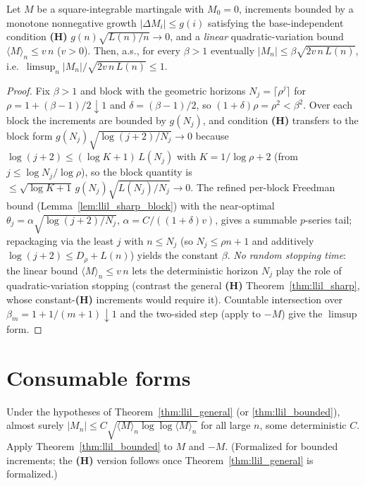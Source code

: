 \begin{theorem}
\label{thm:llil_growth_sharp}
\leanok
{}
Let $M$ be a square-integrable martingale with $M_0=0$, increments bounded by a monotone
nonnegative growth $|\Delta M_i|\le g(i)$ satisfying the base-independent condition
\textbf{(H)} $g(n)\sqrt{L(n)/n}\to0$, and a \emph{linear} quadratic-variation bound
$\langle M\rangle_n\le v\,n$ ($v>0$). Then, a.s., for every $\beta>1$ eventually
$|M_n|\le\beta\sqrt{2v\,n\,L(n)}$, i.e.\ $\limsup_n|M_n|/\sqrt{2v\,n\,L(n)}\le1$.
\end{theorem}
\begin{proof}\leanok
Fix $\beta>1$ and block with the geometric horizons $N_j=\lceil\rho^j\rceil$ for
$\rho=1+(\beta-1)/2\downarrow1$ and $\delta=(\beta-1)/2$, so $(1+\delta)\rho=\rho^2<\beta^2$.
Over each block the increments are bounded by $g(N_j)$, and condition \textbf{(H)} transfers
to the block form $g(N_j)\sqrt{\log(j+2)/N_j}\to0$ because
$\log(j+2)\le(\log K+1)\,L(N_j)$ with $K=1/\log\rho+2$ (from $j\le\log N_j/\log\rho$), so the
block quantity is $\le\sqrt{\log K+1}\,g(N_j)\sqrt{L(N_j)/N_j}\to0$. The refined per-block
Freedman bound (Lemma~\ref{lem:llil_sharp_block}) with the near-optimal
$\theta_j=\alpha\sqrt{\log(j+2)/N_j}$, $\alpha=C/((1+\delta)v)$, gives a summable
$p$-series tail; repackaging via the least $j$ with $n\le N_j$ (so $N_j\le\rho n+1$ and
additively $\log(j+2)\le D_\rho+L(n)$) yields the constant $\beta$. \emph{No random
stopping time}: the linear bound $\langle M\rangle_n\le v\,n$ lets the deterministic horizon
$N_j$ play the role of quadratic-variation stopping (contrast the general \textbf{(H)}
Theorem~\ref{thm:llil_sharp}, whose constant-\textbf{(H)} increments would require it).
Countable intersection over $\beta_m=1+1/(m+1)\downarrow1$ and the two-sided step (apply to
$-M$) give the $\limsup$ form.
\end{proof}

\section{Consumable forms}
\label{sec:llil_forms}

\begin{corollary}\label{cor:llil_norm}
\leanok
{}
Under the hypotheses of Theorem~\ref{thm:llil_general} (or \ref{thm:llil_bounded}),
almost surely $|M_n|\le C\sqrt{\langle M\rangle_n\log\log\langle M\rangle_n}$ for all
large $n$, some deterministic $C$. Apply Theorem~\ref{thm:llil_bounded} to $M$ and $-M$.
(Formalized for bounded increments; the \textbf{(H)} version follows once
Theorem~\ref{thm:llil_general} is formalized.)
\end{corollary}

